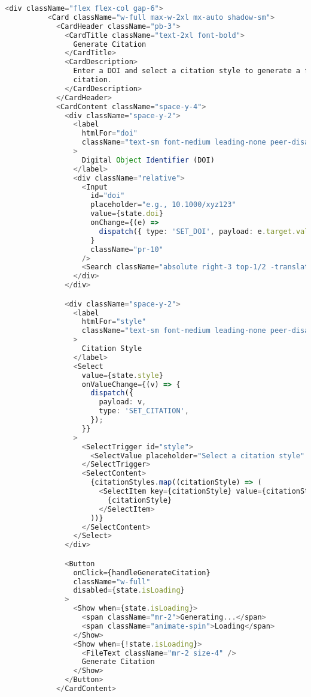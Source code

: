 \begin{lstlisting}[language=TypeScript, caption={Pembuatan Sitasi}, inputencoding=utf8]
        <div className="flex flex-col gap-6">
          <Card className="w-full max-w-2xl mx-auto shadow-sm">
            <CardHeader className="pb-3">
              <CardTitle className="text-2xl font-bold">
                Generate Citation
              </CardTitle>
              <CardDescription>
                Enter a DOI and select a citation style to generate a formatted
                citation.
              </CardDescription>
            </CardHeader>
            <CardContent className="space-y-4">
              <div className="space-y-2">
                <label
                  htmlFor="doi"
                  className="text-sm font-medium leading-none peer-disabled:cursor-not-allowed peer-disabled:opacity-70"
                >
                  Digital Object Identifier (DOI)
                </label>
                <div className="relative">
                  <Input
                    id="doi"
                    placeholder="e.g., 10.1000/xyz123"
                    value={state.doi}
                    onChange={(e) =>
                      dispatch({ type: 'SET_DOI', payload: e.target.value })
                    }
                    className="pr-10"
                  />
                  <Search className="absolute right-3 top-1/2 -translate-y-1/2 size-4 text-muted-foreground" />
                </div>
              </div>

              <div className="space-y-2">
                <label
                  htmlFor="style"
                  className="text-sm font-medium leading-none peer-disabled:cursor-not-allowed peer-disabled:opacity-70"
                >
                  Citation Style
                </label>
                <Select
                  value={state.style}
                  onValueChange={(v) => {
                    dispatch({
                      payload: v,
                      type: 'SET_CITATION',
                    });
                  }}
                >
                  <SelectTrigger id="style">
                    <SelectValue placeholder="Select a citation style" />
                  </SelectTrigger>
                  <SelectContent>
                    {citationStyles.map((citationStyle) => (
                      <SelectItem key={citationStyle} value={citationStyle}>
                        {citationStyle}
                      </SelectItem>
                    ))}
                  </SelectContent>
                </Select>
              </div>

              <Button
                onClick={handleGenerateCitation}
                className="w-full"
                disabled={state.isLoading}
              >
                <Show when={state.isLoading}>
                  <span className="mr-2">Generating...</span>
                  <span className="animate-spin">Loading</span>
                </Show>
                <Show when={!state.isLoading}>
                  <FileText className="mr-2 size-4" />
                  Generate Citation
                </Show>
              </Button>
            </CardContent>


\end{lstlisting}
